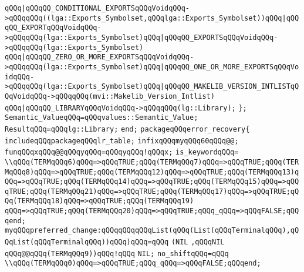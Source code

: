 \verb|qQQq|\verb#|qQQqQQ_CONDITIONAL_EXPORTSqQQqVoidqQQq->qQQqqQQq((lga::Exports_Symbolset,qQQqlga::Exports_Symbolset))qQQq|qQQqQQ_EXPORTqQQqVoidqQQq->qQQqqQQq(lga::Exports_Symbolset)qQQq|qQQqQQ_EXPORTSqQQqVoidqQQq->qQQqqQQq(lga::Exports_Symbolset)#\newline
\verb|qQQq|\verb#|qQQqQQ_ZERO_OR_MORE_EXPORTSqQQqVoidqQQq->qQQqqQQq(lga::Exports_Symbolset)qQQq|qQQqQQ_ONE_OR_MORE_EXPORTSqQQqVoidqQQq->qQQqqQQq(lga::Exports_Symbolset)qQQq|qQQqQQ_MAKELIB_VERSION_INTLISTqQQqVoidqQQq->qQQqqQQq(mvi::Makelib_Version_Intlist)#\newline
\verb|qQQq|\verb#|qQQqQQ_LIBRARYqQQqVoidqQQq->qQQqqQQq(lg::Library);#\newline
\verb|};|\newline
\verb|Semantic_ValueqQQq=qQQqvalues::Semantic_Value;|\newline
\verb|ResultqQQq=qQQqlg::Library;|\newline
\verb|end;|\newline
\verb|packageqQQqerror_recovery{|\newline
\verb|includeqQQqpackageqQQqlr_table;|\newline
\verb|infixqQQqmyqQQq60qQQq@@;|\newline
\verb|funqQQqxqQQq@@qQQqyqQQq=qQQqyqQQq!qQQqx;|\newline
\verb|is_keywordqQQq=|\newline
\verb|\\qQQq(TERMqQQq6)qQQq=>qQQqTRUE;qQQq(TERMqQQq7)qQQq=>qQQqTRUE;qQQq(TERMqQQq8)qQQq=>qQQqTRUE;qQQq(TERMqQQq12)qQQq=>qQQqTRUE;qQQq(TERMqQQq13)qQQq=>qQQqTRUE;qQQq(TERMqQQq14)qQQq=>qQQqTRUE;qQQq(TERMqQQq15)qQQq=>qQQqTRUE;qQQq(TERMqQQq21)qQQq=>qQQqTRUE;qQQq(TERMqQQq17)qQQq=>qQQqTRUE;qQQq(TERMqQQq18)qQQq=>qQQqTRUE;qQQq(TERMqQQq19)|\newline
\verb|qQQq=>qQQqTRUE;qQQq(TERMqQQq20)qQQq=>qQQqTRUE;qQQq_qQQq=>qQQqFALSE;qQQqend;|\newline
\verb|myqQQqpreferred_change:qQQqqQQqqQQqList(qQQq(List(qQQqTerminalqQQq),qQQqList(qQQqTerminalqQQq))qQQq)qQQq=qQQq|\newline
\verb|(NIL|\newline
\verb|,qQQqNIL|\newline
\verb|qQQq@@qQQq(TERMqQQq9))qQQq!qQQq|\newline
\verb|NIL;|\newline
\verb|no_shiftqQQq=qQQq|\newline
\verb|\\qQQq(TERMqQQq0)qQQq=>qQQqTRUE;qQQq_qQQq=>qQQqFALSE;qQQqend;|\newline
